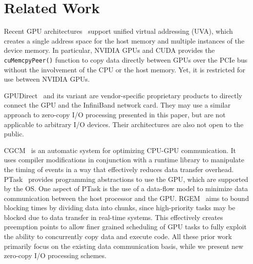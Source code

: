 \section{Related Work}
\label{sec:related_work}

Recent GPU architectures~\cite{NVIDIA_Fermi, NVIDIA_Kepler} support
unified virtual addressing (UVA), which creates a single address space
for the host memory and multiple instances of the device memory.
In particular, NVIDIA GPUs and CUDA provides the {\tt cuMemcpyPeer()}
function to copy data directly between GPUs over the PCIe bus without
the involvement of the CPU or the host memory.
Yet, it is restricted for use between NVIDIA GPUs.

GPUDirect~\cite{GPUDirect} and its variant are vendor-specific
proprietary products to directly 
connect the GPU and the InfiniBand network card.
They may use a similar approach to zero-copy I/O processing presented in
this paper, but are not applicable to arbitrary I/O devices.
Their architectures are also not open to the public.

CGCM~\cite{Jablin_PLDI11} is an automatic system for optimizing CPU-GPU
communication.
It uses compiler modifications in conjunction with a runtime library to
manipulate the timing of events in a way that effectively reduces
data transfer overhead.
PTask~\cite{Rossbach_SOSP11} provides programming abstractions to use
the GPU, which are supported by the OS.
One aspect of PTask is the use of a data-flow model to
minimize data communication between the host processor and the GPU. 
RGEM~\cite{Kato_RTSS11} aims to bound blocking times by dividing data
into chunks, since high-priority tasks may be blocked due to data
transfer in real-time systems.
This effectively creates preemption points to allow finer grained
scheduling of GPU tasks to fully exploit the ability to concurrently
copy data and execute code.
All these prior work primarily focus on the existing data communication
basis, while we present new zero-copy I/O processing schemes.
